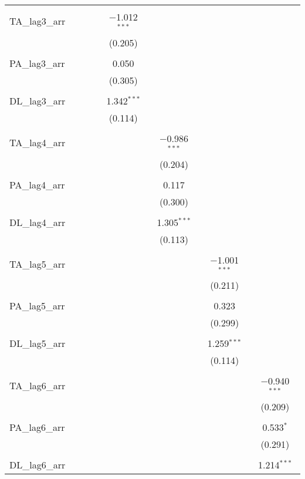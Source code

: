 \begin{table}[!htbp]
\begin{tabular}{@{\extracolsep{5pt}}lccccccc}
  & & & & & & & \\ 
 TA\_lag3\_arr &  &  &  & $-$1.012$^{***}$ &  &  &  \\ 
  &  &  &  & (0.205) &  &  &  \\ 
  & & & & & & & \\ 
 PA\_lag3\_arr &  &  &  & 0.050 &  &  &  \\ 
  &  &  &  & (0.305) &  &  &  \\ 
  & & & & & & & \\ 
 DL\_lag3\_arr &  &  &  & 1.342$^{***}$ &  &  &  \\ 
  &  &  &  & (0.114) &  &  &  \\ 
  & & & & & & & \\ 
 TA\_lag4\_arr &  &  &  &  & $-$0.986$^{***}$ &  &  \\ 
  &  &  &  &  & (0.204) &  &  \\ 
  & & & & & & & \\ 
 PA\_lag4\_arr &  &  &  &  & 0.117 &  &  \\ 
  &  &  &  &  & (0.300) &  &  \\ 
  & & & & & & & \\ 
 DL\_lag4\_arr &  &  &  &  & 1.305$^{***}$ &  &  \\ 
  &  &  &  &  & (0.113) &  &  \\ 
  & & & & & & & \\ 
 TA\_lag5\_arr &  &  &  &  &  & $-$1.001$^{***}$ &  \\ 
  &  &  &  &  &  & (0.211) &  \\ 
  & & & & & & & \\ 
 PA\_lag5\_arr &  &  &  &  &  & 0.323 &  \\ 
  &  &  &  &  &  & (0.299) &  \\ 
  & & & & & & & \\ 
 DL\_lag5\_arr &  &  &  &  &  & 1.259$^{***}$ &  \\ 
  &  &  &  &  &  & (0.114) &  \\ 
  & & & & & & & \\ 
 TA\_lag6\_arr &  &  &  &  &  &  & $-$0.940$^{***}$ \\ 
  &  &  &  &  &  &  & (0.209) \\ 
  & & & & & & & \\ 
 PA\_lag6\_arr &  &  &  &  &  &  & 0.533$^{*}$ \\ 
  &  &  &  &  &  &  & (0.291) \\ 
  & & & & & & & \\ 
 DL\_lag6\_arr &  &  &  &  &  &  & 1.214$^{***}$ \\ 

\end{tabular}
\end{table}
